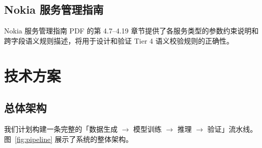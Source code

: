 \documentclass[12pt, a4paper]{article}
\begin{document}
\subsection{Nokia 服务管理指南}

Nokia 服务管理指南 PDF 的第 4.7--4.19 章节提供了各服务类型的参数约束说明和跨字段语义规则描述，将用于设计和验证 Tier 4 语义校验规则的正确性。

\section{技术方案}
\label{sec:approach}

\subsection{总体架构}

我们计划构建一条完整的「数据生成 $\to$ 模型训练 $\to$ 推理 $\to$ 验证」流水线。图~\ref{fig:pipeline} 展示了系统的整体架构。
\end{document}
